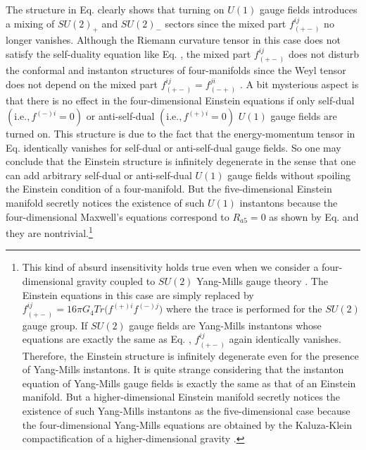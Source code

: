 \documentclass[12pt,epsf]{article}
\begin{document}
The structure in Eq.  clearly shows that turning on $U(1)$ gauge fields
introduces a mixing of $SU(2)_+$ and $SU(2)_-$ sectors since the mixed part $f^{ij}_{(+-)}$ no longer vanishes.
Although the Riemann curvature tensor in this case does not satisfy the self-duality equation like Eq. ,
the mixed part $f^{ij}_{(+-)}$ does not disturb the conformal and instanton structures of four-manifolds
since the Weyl tensor does not depend on the mixed part $f^{ij}_{(+-)} = f^{ji}_{(-+)}$ \cite{oh-yang}.
A bit mysterious aspect is that there is no effect in the four-dimensional Einstein equations 
if only self-dual $(\mathrm{i.e.}, f^{(-)i} = 0)$ or anti-self-dual $(\mathrm{i.e.}, f^{(+)i} = 0)$ $U(1)$
gauge fields are turned on. This structure is due to the fact that the energy-momentum tensor
in Eq.  identically vanishes for self-dual or anti-self-dual gauge fields.
So one may conclude that the Einstein structure is infinitely degenerate in the sense
that one can add arbitrary self-dual or anti-self-dual $U(1)$ gauge fields without spoiling
the Einstein condition of a four-manifold. But the five-dimensional Einstein manifold secretly notices
the existence of such $U(1)$ instantons because the four-dimensional Maxwell's equations 
correspond to $R_{a5} = 0$ as shown by Eq.  and
they are nontrivial.\footnote{This kind of absurd insensitivity holds true even
when we consider a four-dimensional gravity coupled to $SU(2)$ Yang-Mills gauge theory \cite{oh-yang}.
The Einstein equations in this case are simply replaced by $f^{ij}_{(+-)}
= 16 \pi G_4 Tr \big( f^{(+)i} f^{(-)j} \big)$ where the trace is performed for the $SU(2)$ gauge group.
If $SU(2)$ gauge fields are Yang-Mills instantons whose equations are exactly the same as Eq. ,
$f^{ij}_{(+-)}$ again identically vanishes. Therefore, the Einstein structure is infinitely degenerate
even for the presence of Yang-Mills instantons. It is quite strange considering that the instanton equation of
Yang-Mills gauge fields is exactly the same as that of an Einstein manifold.
But a higher-dimensional Einstein manifold secretly notices
the existence of such Yang-Mills instantons as the five-dimensional case
because the four-dimensional Yang-Mills equations
are obtained by the Kaluza-Klein compactification of a higher-dimensional gravity \cite{cho-freund}.}
\end{document}

